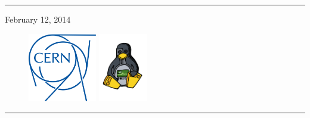 \begin{titlepage}

\vspace*{3cm}


\noindent \rule{\textwidth}{.1cm}

\hfill February 12, 2014

\vspace*{3cm}

\begin{figure}[h]
  \includegraphics[height=3cm]{fig/cern-logo}
  \hfill
  \includegraphics[height=3cm]{fig/ohwr-logo}
\end{figure}

\vfill


\noindent \rule{\textwidth}{.05cm}

\end{titlepage}
